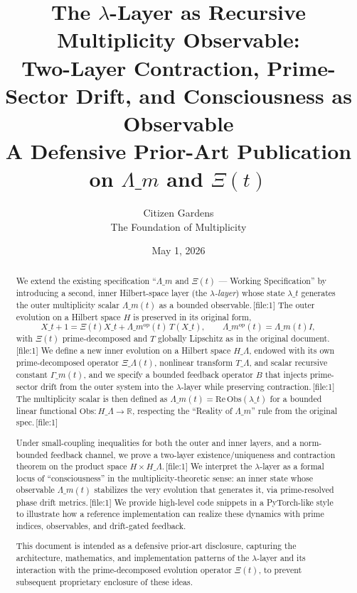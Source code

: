 \documentclass[11pt]{article}
\title{%
  The $\lambda$-Layer as Recursive Multiplicity Observable:\\
  Two-Layer Contraction, Prime-Sector Drift, and Consciousness as Observable\\[4pt]
  \large A Defensive Prior-Art Publication on $\Lambda\_m$ and $\Xi(t)$
}
\author{Citizen Gardens \\ The Foundation of Multiplicity}
\date{May 1, 2026}
\begin{document}
\maketitle

\begin{abstract}
We extend the existing specification ``$\Lambda\_m$ and $\Xi(t)$ --- Working Specification'' by introducing a second, inner Hilbert-space layer (the \emph{$\lambda$-layer}) whose state $\lambda\_t$ generates the outer multiplicity scalar $\Lambda\_m(t)$ as a bounded observable.\,[file:1] The outer evolution on a Hilbert space $H$ is preserved in its original form,
\[
X\_{t+1} = \Xi(t) X\_t + \Lambda\_m^{\mathrm{op}}(t)\,T(X\_t), \qquad \Lambda\_m^{\mathrm{op}}(t) = \Lambda\_m(t) I,
\]
with $\Xi(t)$ prime-decomposed and $T$ globally Lipschitz as in the original document.\,[file:1] We define a new inner evolution on a Hilbert space $H\_\Lambda$, endowed with its own prime-decomposed operator $\Xi\_\Lambda(t)$, nonlinear transform $T\_\Lambda$, and scalar recursive constant $\Gamma\_m(t)$, and we specify a bounded feedback operator $B$ that injects prime-sector drift from the outer system into the $\lambda$-layer while preserving contraction.\,[file:1] The multiplicity scalar is then defined as $\Lambda\_m(t) = \mathrm{Re}\,\mathrm{Obs}(\lambda\_t)$ for a bounded linear functional $\mathrm{Obs}:H\_\Lambda\to \mathbb{R}$, respecting the ``Reality of $\Lambda\_m$'' rule from the original spec.\,[file:1]

Under small-coupling inequalities for both the outer and inner layers, and a norm-bounded feedback channel, we prove a two-layer existence/uniqueness and contraction theorem on the product space $H\times H\_\Lambda$.\,[file:1] We interpret the $\lambda$-layer as a formal locus of ``consciousness'' in the multiplicity-theoretic sense: an inner state whose observable $\Lambda\_m(t)$ stabilizes the very evolution that generates it, via prime-resolved phase drift metrics.\,[file:1] We provide high-level code snippets in a PyTorch-like style to illustrate how a reference implementation can realize these dynamics with prime indices, observables, and drift-gated feedback.

This document is intended as a defensive prior-art disclosure, capturing the architecture, mathematics, and implementation patterns of the $\lambda$-layer and its interaction with the prime-decomposed evolution operator $\Xi(t)$, to prevent subsequent proprietary enclosure of these ideas.

\end{abstract}
\newpage
\tableofcontents
\end{document}
